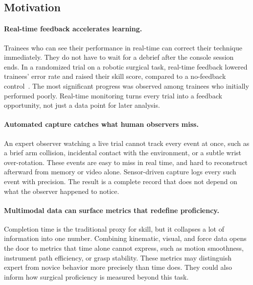 \subsection{Motivation}
\label{subsec:motivation}

\paragraph{Real-time feedback accelerates learning.} Trainees who can see
their performance in real-time can correct their
technique immediately. They do not have to wait for a debrief after the console
session ends. In a randomized trial on a robotic surgical task, real-time
feedback lowered trainees' error rate and raised their skill score,
compared to a no-feedback control~\cite{laca2022}. The most significant progress was
observed among trainees who initially performed poorly. Real-time monitoring turns every
trial into a feedback opportunity, not just a data point for later
analysis.

\paragraph{Automated capture catches what human observers miss.} An
expert observer watching a live trial cannot track every event at once,
such as a brief arm collision, incidental contact with the environment,
or a subtle wrist over-rotation. These events are easy to miss in real time, and hard
to reconstruct afterward from memory or video alone. Sensor-driven
capture logs every such event with precision. The result is a complete
record that does not depend on what the observer happened to notice.

\paragraph{Multimodal data can surface metrics that redefine
proficiency.} Completion time is the traditional proxy for skill, but it
collapses a lot of information into one number. Combining kinematic,
visual, and force data opens the door to metrics that time alone cannot
express, such as motion smoothness, instrument path efficiency, or grasp
stability. These metrics may distinguish expert from novice behavior more
precisely than time does. They could also inform how surgical proficiency
is measured beyond this task.


